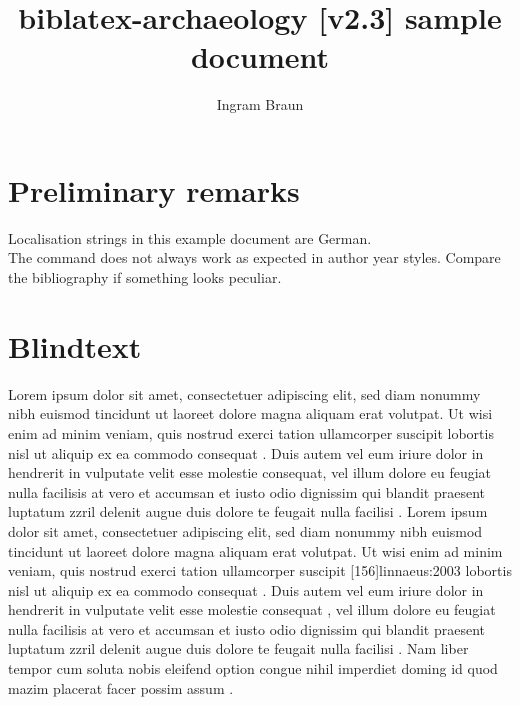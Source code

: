 \documentclass[a4paper,12pt,twoside]{scrartcl}
\title{biblatex-archaeology [v2.3] sample document}
\subtitle{\explhead}
\author{Ingram Braun}
\newcommand{\exmplwarn}[1]{\textcolor{red}{\faExclamationTriangle} #1\\}
\begin{document}
\maketitle
\tableofcontents

\section{Preliminary remarks}

\exmplwarn{Localisation strings in this example document are German.}
    {\exmplwarn{The \detokenize{\fullcite} command does not always work as expected in author year styles. Compare the bibliography if something looks peculiar.}%
    }
    {}

\section{Blindtext}

Lorem ipsum dolor sit amet, consectetuer adipiscing elit\autocite[145--146]{todorova:et:al:1981}, sed diam nonummy nibh euismod tincidunt ut laoreet dolore magna aliquam erat volutpat\autocite[145--146]{todorova:et:al:1981}. Ut wisi enim ad minim veniam\autocite[3--9]{todorova:et:al:1981}, quis nostrud exerci tation ullamcorper suscipit lobortis nisl ut aliquip ex ea commodo consequat \autocite{auler:hiller:2015}. Duis autem vel eum iriure dolor in hendrerit in vulputate velit esse molestie consequat, vel illum dolore eu feugiat nulla facilisis at vero et accumsan et iusto odio dignissim qui blandit praesent luptatum zzril delenit augue duis dolore te feugait nulla facilisi \autocites[68]{auler:hiller:2011}[48]{auler:hiller:2015a}[159--187]{auler:hiller:2015}[40--41]{auler:hiller:2016}[15--23]{tacitus:1981}[19]{de:neck:yoder:1978}[69]{auler:hiller:2011}. Lorem ipsum dolor sit amet, consectetuer adipiscing elit, sed diam nonummy nibh euismod tincidunt ut laoreet dolore magna aliquam erat volutpat\autocite[163--164]{auler:hiller:2015}. Ut wisi enim ad minim veniam\autocite[163--168]{auler:hiller:2015}, quis nostrud exerci tation ullamcorper suscipit [156]{linnaeus:2003} lobortis nisl ut aliquip ex ea commodo consequat \autocite{kenmore}. Duis autem vel eum iriure dolor in hendrerit in vulputate velit esse molestie consequat \autocites[73--75]{mueller:f:1991}[105--108]{mueller:a:1991}[68--70]{mueller:h:1900}[61]{mueller:har:1988}, vel illum dolore eu feugiat nulla facilisis at vero et accumsan et iusto odio dignissim qui blandit praesent luptatum zzril delenit augue duis dolore te feugait nulla facilisi \autocite{kenmore}. Nam liber tempor cum soluta nobis eleifend option congue nihil imperdiet doming id quod mazim placerat facer possim assum \autocite[145--146]{todorova:et:al:1981}.
\end{document}

